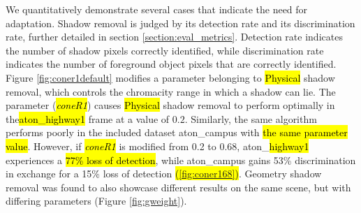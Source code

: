 We quantitatively demonstrate several cases that indicate the need for adaptation. Shadow removal is judged by its detection rate and its discrimination rate, further detailed in section \ref{section:eval_metrics}. Detection rate indicates the number of shadow pixels correctly identified, while discrimination rate indicates the number of foreground object pixels that are correctly identified. Figure \ref{fig:coner1default} modifies a parameter belonging to \hl{Physical} shadow removal, which controls the chromacity range in which a shadow can lie. The parameter (\hl{\textit{coneR1}}) causes \hl{Physical} shadow removal to perform optimally in the\hl{aton\_highway1} frame at a value of $0.2$. Similarly, the same algorithm performs poorly in the included dataset aton\_campus with \hl{the same parameter value}. However, if \hl{\textit{coneR1}} is modified from 0.2 to 0.68, aton\_\hl{highway1} experiences a \hl{77\% loss of detection}, while aton\_campus gains 53\% discrimination in exchange for a 15\% loss of detection \hl{(\ref{fig:coner168})}. Geometry shadow removal was found to also showcase different results on the same scene, but with differing parameters (Figure \ref{fig:gweight}). 

